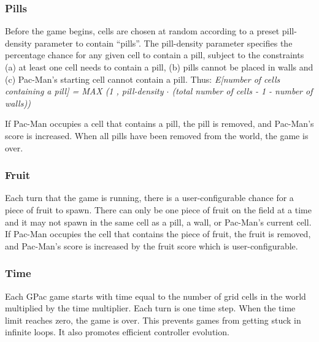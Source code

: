 \documentclass{article}
\begin{document}
\subsubsection*{Pills}
Before the game begins, cells are chosen at random according to a preset pill-density parameter to contain ``pills''. The pill-density parameter specifies the percentage chance for any given cell to contain a pill, subject to the constraints (a) at least one cell needs to contain a pill, (b) pills cannot be placed in walls and (c) Pac-Man's starting cell cannot contain a pill. Thus: \emph{E[number of cells containing a pill] = MAX (1 , pill-density $\cdot$ (total number of cells - 1 - number of walls))}

If Pac-Man occupies a cell that contains a pill, the pill is removed, and Pac-Man's score is increased. When all pills have been removed from the world, the game is over. 

\subsubsection*{Fruit}
Each turn that the game is running, there is a user-configurable chance for a piece of fruit to spawn. There can only be one piece of fruit on the field at a time and it may not spawn in the same cell as a pill, a wall, or Pac-Man's current cell. If Pac-Man occupies the cell that contains the piece of fruit, the fruit is removed, and Pac-Man's score is increased by the fruit score which is user-configurable.

\subsubsection*{Time}
Each GPac game starts with time equal to the number of grid cells in the world multiplied by the time multiplier. Each turn is one time step.  When the time limit reaches zero, the game is over. This prevents games from getting stuck in infinite loops. It also promotes efficient controller evolution.
\end{document}
